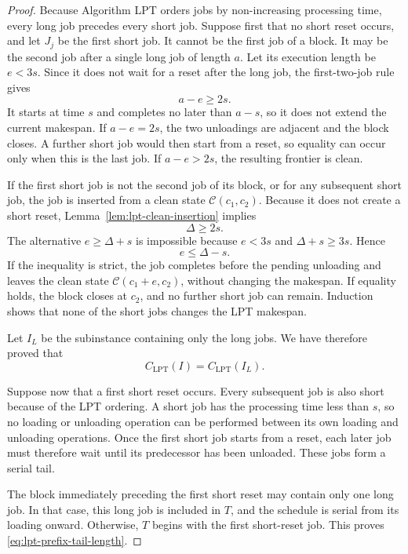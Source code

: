 \documentclass[11pt]{article}
\begin{document}
\begin{proof}
Because Algorithm LPT orders jobs by non-increasing processing time, every long job precedes every
short job. Suppose first that no short reset occurs, and let \(J_j\) be the first short
job. It cannot be the first job of a block. It may be the second job after a
single long job of length \(a\). Let its execution length be \(e<3s\). Since
it does not wait for a reset after the long job, the first-two-job rule gives
\[
a-e\ge2s.
\]
It starts at time \(s\) and completes no later than \(a-s\), so it does not
extend the current makespan. If \(a-e=2s\), the two unloadings are adjacent and
the block closes. A further short job would then start from a reset, so equality
can occur only when this is the last job. If \(a-e>2s\), the resulting frontier
is clean.

If the first short job is not the second job of its block, or for any subsequent
short job, the job is inserted from a clean state
\(\mathcal C(c_1,c_2)\). Because it does not create a short reset,
Lemma~\ref{lem:lpt-clean-insertion} implies
\[
\Delta\ge2s.
\]
The alternative \(e\ge\Delta+s\) is impossible because \(e<3s\) and
\(\Delta+s\ge3s\). Hence
\[
e\le\Delta-s.
\]
If the inequality is strict, the job completes before the pending unloading and
leaves the clean state \(\mathcal C(c_1+e,c_2)\), without changing the
makespan. If equality holds, the block closes at \(c_2\), and no further short
job can remain. Induction shows that none of the short jobs changes the LPT
makespan.

Let \(I_L\) be the subinstance containing only the long jobs. We have therefore
proved that
\begin{equation}
C_{\mathrm{LPT}}(I)=C_{\mathrm{LPT}}(I_L).
\label{eq:lpt-delete-short}
\end{equation}

Suppose now that a first short reset occurs. Every subsequent job is also short
because of the LPT ordering. A short job has the processing time less than \(s\),
so no loading or unloading operation can be performed between its own loading
and unloading operations. Once the first short job starts from a reset, each
later job must therefore wait until its predecessor has been unloaded. These
jobs form a serial tail.

The block immediately preceding the first short reset may contain only one long
job. In that case, this long job is included in \(T\), and the schedule is
serial from its loading onward. Otherwise, \(T\) begins with the first
short-reset job. This proves \eqref{eq:lpt-prefix-tail-length}.


\end{proof}
\end{document}
